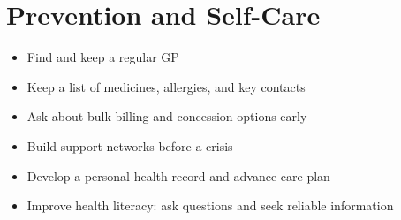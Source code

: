 \section*{Prevention and Self-Care}
\begin{itemize}
    \item Find and keep a regular GP
    \item Keep a list of medicines, allergies, and key contacts
    \item Ask about bulk-billing and concession options early
    \item Build support networks before a crisis
    \item Develop a personal health record and advance care plan
    \item Improve health literacy: ask questions and seek reliable information
\end{itemize}
